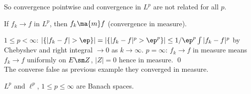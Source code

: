 So convergence pointwise and convergence in $L^p$ are not related for all $p$.


\begin{lem}
If $f_k \to f$ in $L^p$, then $f_k \ma{m} f$ (convergence in measure). 
\end{lem}

\pf $1 \leq p <\infty$: $|\{|f_k-f|>\ep\}|= |\{|f_k-f|^p>\ep^p\}| \leq 1/\ep^p \int |f_k-f|^p$ by Chebyshev and right integral $\to 0$ as $k \to \infty$. $p=\infty$: $f_k \to f$ in measure means $f_k \to f$ uniformly on $E\sm Z$, $|Z|=0$ hence in measure. \qed \\


The converse false as previous example they converged in measure.


\begin{thm} 
$L^p$ and $\ell^p$, $1 \leq p \leq \infty$ are Banach spaces.
\end{thm}

